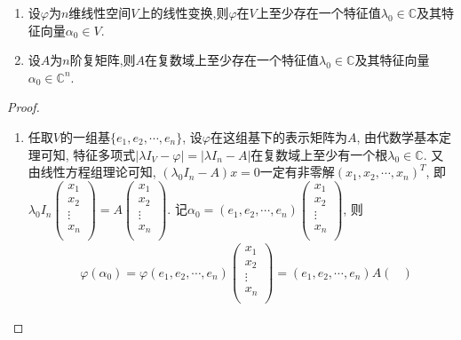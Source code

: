 \documentclass[../../main.tex]{subfiles}%
\begin{document}
\begin{proposition}\label{proposition:线性变换或矩阵在复线性空间上至少存在一个特征值及与其特征向量}
\begin{enumerate}
\item 设$\varphi$为$n$维线性空间$V$上的线性变换,则$\varphi$在$V$上至少存在一个特征值$\lambda_0\in\mathbb{C}$及其特征向量$\alpha_0\in V$.

\item 设$A$为$n$阶复矩阵,则$A$在复数域上至少存在一个特征值$\lambda_0\in\mathbb{C}$及其特征向量$\alpha_0\in\mathbb{C}^n$.
\end{enumerate}
\end{proposition}
\begin{proof}
\begin{enumerate}
\item 任取\(V\)的一组基\(\{ e_1,e_2,\cdots ,e_n \}\), 设\(\varphi\)在这组基下的表示矩阵为\(A\), 由代数学基本定理可知, 特征多项式\(|\lambda I_V - \varphi| = |\lambda I_n - A|\)在复数域上至少有一个根\(\lambda_0\in \mathbb{C}\). 又由线性方程组理论可知, \((\lambda_0I_n - A)x = 0\)一定有非零解\((x_1,x_2,\cdots ,x_n)^T\), 即\(\lambda_0I_n\begin{pmatrix}
    x_1\\
    x_2\\
    \vdots\\
    x_n\\
    \end{pmatrix}=A\begin{pmatrix}
    x_1\\
    x_2\\
    \vdots\\
    x_n\\
    \end{pmatrix}\). 记\(\alpha_0 = (e_1,e_2,\cdots ,e_n)\begin{pmatrix}
    x_1\\
    x_2\\
    \vdots\\
    x_n\\
    \end{pmatrix}\), 则
    \begin{align*}
    &\varphi(\alpha_0)=\varphi(e_1,e_2,\cdots ,e_n)\begin{pmatrix}
    x_1\\
    x_2\\
    \vdots\\
    x_n\\
    \end{pmatrix}=(e_1,e_2,\cdots ,e_n)A\begin{pmatrix}

\end{pmatrix}
\end{align*}
\end{enumerate}
\end{proof}
\end{document}
